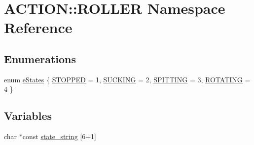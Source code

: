 \hypertarget{namespace_a_c_t_i_o_n_1_1_r_o_l_l_e_r}{
\section{\-A\-C\-T\-I\-O\-N\-:\-:\-R\-O\-L\-L\-E\-R \-Namespace \-Reference}
\label{namespace_a_c_t_i_o_n_1_1_r_o_l_l_e_r}
}
\subsection*{\-Enumerations}
\begin{DoxyCompactItemize}
\item 
enum \hyperlink{namespace_a_c_t_i_o_n_1_1_r_o_l_l_e_r_ae1ef7714dbb408df0bfe8c30ccf06c39}{e\-States} \{ \hyperlink{namespace_a_c_t_i_o_n_1_1_r_o_l_l_e_r_ae1ef7714dbb408df0bfe8c30ccf06c39a0d9d8be1d9f05f108d181c8c2643f41e}{\-S\-T\-O\-P\-P\-E\-D} =  1, 
\hyperlink{namespace_a_c_t_i_o_n_1_1_r_o_l_l_e_r_ae1ef7714dbb408df0bfe8c30ccf06c39a92acdc9c21b8b6faee47a37b64bc4e32}{\-S\-U\-C\-K\-I\-N\-G} =  2, 
\hyperlink{namespace_a_c_t_i_o_n_1_1_r_o_l_l_e_r_ae1ef7714dbb408df0bfe8c30ccf06c39a1dd696bc56f5463a16a50e54f6b39b3b}{\-S\-P\-I\-T\-T\-I\-N\-G} =  3, 
\hyperlink{namespace_a_c_t_i_o_n_1_1_r_o_l_l_e_r_ae1ef7714dbb408df0bfe8c30ccf06c39ac3d2f7151b455329420ed037b2e6d145}{\-R\-O\-T\-A\-T\-I\-N\-G} =  4
 \}
\end{DoxyCompactItemize}
\subsection*{\-Variables}
\begin{DoxyCompactItemize}
\item 
char $\ast$const \hyperlink{namespace_a_c_t_i_o_n_1_1_r_o_l_l_e_r_a3cb1b43d9981db41f686a860e000a2c7}{state\-\_\-string} \mbox{[}6+1\mbox{]}
\end{DoxyCompactItemize}


